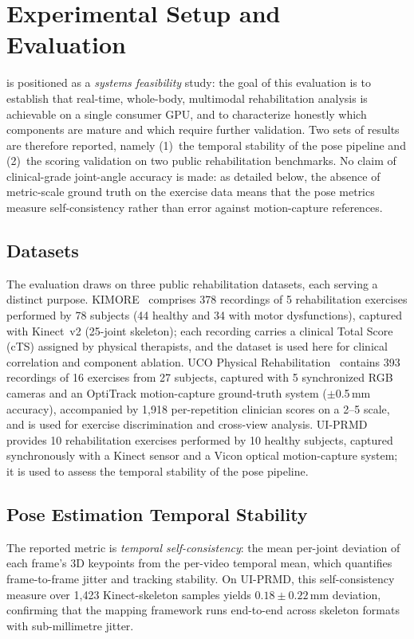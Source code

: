 \section{Experimental Setup and Evaluation}
\label{sec:experiments}

\system{} is positioned as a \emph{systems feasibility} study: the goal of this evaluation is to establish that real-time, whole-body, multimodal rehabilitation analysis is achievable on a single consumer GPU, and to characterize honestly which components are mature and which require further validation. Two sets of results are therefore reported, namely (1)~the temporal stability of the pose pipeline and (2)~the scoring validation on two public rehabilitation benchmarks. No claim of clinical-grade joint-angle accuracy is made: as detailed below, the absence of metric-scale ground truth on the exercise data means that the pose metrics measure self-consistency rather than error against motion-capture references.

\subsection{Datasets}
The evaluation draws on three public rehabilitation datasets, each serving a distinct purpose. KIMORE~\cite{Capecci2019} comprises 378 recordings of 5 rehabilitation exercises performed by 78 subjects (44 healthy and 34 with motor dysfunctions), captured with Kinect~v2 (25-joint skeleton); each recording carries a clinical Total Score (cTS) assigned by physical therapists, and the dataset is used here for clinical correlation and component ablation. UCO Physical Rehabilitation~\cite{AguilarOrtega2023} contains 393 recordings of 16 exercises from 27 subjects, captured with 5 synchronized RGB cameras and an OptiTrack motion-capture ground-truth system ($\pm$0.5\,mm accuracy), accompanied by 1{,}918 per-repetition clinician scores on a 2--5 scale, and is used for exercise discrimination and cross-view analysis. UI-PRMD~\cite{Vakanski2018} provides 10 rehabilitation exercises performed by 10 healthy subjects, captured synchronously with a Kinect sensor and a Vicon optical motion-capture system; it is used to assess the temporal stability of the pose pipeline.

\subsection{Pose Estimation Temporal Stability}
The reported metric is \emph{temporal self-consistency}: the mean per-joint deviation of each frame's 3D keypoints from the per-video temporal mean, which quantifies frame-to-frame jitter and tracking stability. On UI-PRMD, this self-consistency measure over 1{,}423 Kinect-skeleton samples yields $0.18 \pm 0.22$\,mm deviation, confirming that the mapping framework runs end-to-end across skeleton formats with sub-millimetre jitter.

